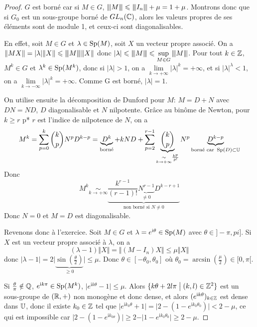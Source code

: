 \begin{proof}
	$G$ est borné car si $M\in G$, ${\left\vert\kern-0.25ex\left\vert\kern-0.25ex\left\vert{}M \right\vert\kern-0.25ex\right\vert\kern-0.25ex\right\vert}\leqslant {\left\vert\kern-0.25ex\left\vert\kern-0.25ex\left\vert{}I_{n} \right\vert\kern-0.25ex\right\vert\kern-0.25ex\right\vert}+\mu=1+\mu$. Montrons donc que si $G_{0}$ est un sous-groupe borné de $GL_{n}(\mathbb{C})$, alors les valeurs propres de ses éléments sont de module 1, et ceux-ci sont diagonalisables.

	En effet, soit $M\in G$ et $\lambda\in\operatorname{Sp}(M)$, soit $X$ un vecteur propre associé. On a 
	$\Vert MX\Vert=\vert\lambda\vert\Vert X\Vert\leqslant{\left\vert\kern-0.25ex\left\vert\kern-0.25ex\left\vert{}M \right\vert\kern-0.25ex\right\vert\kern-0.25ex\right\vert}\Vert X\Vert$ donc $\vert\lambda\vert\leqslant{\left\vert\kern-0.25ex\left\vert\kern-0.25ex\left\vert{}M \right\vert\kern-0.25ex\right\vert\kern-0.25ex\right\vert}\leqslant\sup\limits_{M\in G}{\left\vert\kern-0.25ex\left\vert\kern-0.25ex\left\vert{}M \right\vert\kern-0.25ex\right\vert\kern-0.25ex\right\vert}$. Pour tout $k\in\mathbb{Z}$, $M^{k}\in G$ et $\lambda^{k}\in\operatorname{Sp}(M^{k})$, donc si $\vert\lambda\vert>1$, on a $\lim\limits_{k\to+\infty}\vert\lambda\vert^{k}=+\infty$, et si $\vert\lambda\vert^{\lambda}<1$, on a $\lim\limits_{k\to-\infty}\vert\lambda\vert^{k}=+\infty$. Comme 
	G est borné, $\vert\lambda\vert=1$.

	On utilise ensuite la décomposition de Dunford pour $M$: $M=D+N$ avec $DN=ND$, $D$ diagonalisable et $N$ nilpotente. Grâce au binôme de Newton, pour $k\geqslant r$ p* $r$ est l'indice de nilpotence de $N$, on a
	\begin{equation}M^{k}=\sum_{p=0}^{k}\binom{k}{p}N^{p}D^{k-p}=\underbrace{D^{k}}_{\text{borné}}+kND+\sum_{p=2}^{r-1}\underbrace{\binom{k}{p}}_{\underset{k\to+\infty}{\sim}\frac{k^{p}}{p!}}N^{p}\underbrace{D^{k-p}}_{\text{borné car }\operatorname{Sp}(D)\subset\mathbb{U}}\end{equation}
	Donc
	\begin{equation}M^{k}\underset{k\to+\infty}{\sim}\underbrace{\frac{k^{r-1}}{(r-1)!}\underbrace{N^{r-1}}_{\neq0}D^{k-r+1}}_{\text{non borné si }N\neq0}\end{equation}
	Donc $N=0$ et $M=D$ est diagonalisable.

	Revenons donc à l'exercice. Soit $M\in G$ et $\lambda=e^{\mathrm{i}\theta}\in\operatorname{Sp}(M)$ avec $\theta\in]-\pi,pi]$. Si $X$ est un vecteur propre associé à $\lambda$, on a 
	\begin{equation}(\lambda-1)\Vert X\Vert=\Vert(M-I_{n})X\Vert\leqslant\mu\Vert X\Vert\end{equation}
	donc $\vert\lambda-1\vert=2\vert\underbrace{\sin(\frac{\theta}{2})}_{\geqslant0}\vert\leqslant\mu$.
	Donc $\theta\in[-\theta_{0},\theta_{0}]$ où $\theta_{0}=\arcsin(\frac{\mu}{2})\in[0,\pi[$.

	Si $\frac{\theta}{\pi}\notin\mathbb{Q}$, $e^{\mathrm{i}k\pi}\in\operatorname{Sp}(M^{k})$, $\vert e^{\mathrm{i}k\theta}-1\vert\leqslant\mu$. Alors $\{k\theta+2l\pi\bigm| (k,l)\in\mathbb{Z}^{2}\}$ est un sous-groupe de $(\mathbb{R},+)$ non monogène et donc dense, et alors $(e^{\mathrm{i}k\theta})_{k\in\mathbb{Z}}$ est dense dans $\mathbb{U}$, donc il existe $k_{0}\in\mathbb{Z}$ tel que $\vert e^{\mathrm{i}k_{0}\theta}+1\vert=\vert 2-(1-e^{\mathrm{i}k_{0}\theta_{0}})\vert<2-\mu$, ce qui est impossible car $\vert 2-(1-e^{\mathrm{i}k_{0\theta}})\vert\geqslant2-\vert 1-e^{\mathrm{i}k_{0}\theta_{0}}\vert\geqslant2-\mu$.


\end{proof}
